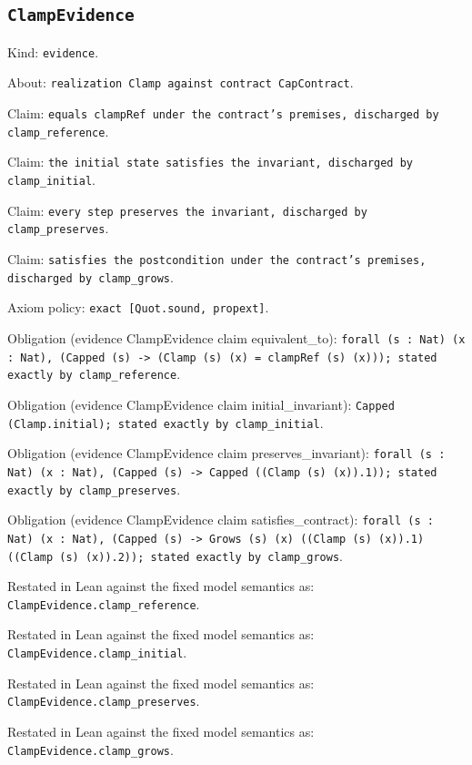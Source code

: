 \documentclass[11pt]{article}
\begin{document}
\subsection*{\texttt{ClampEvidence}}
\noindent Kind: \texttt{evidence}.\par
\noindent About: \texttt{realization Clamp against contract CapContract}.\par
\noindent Claim: \texttt{equals clampRef under the contract's premises, discharged by clamp\_reference}.\par
\noindent Claim: \texttt{the initial state satisfies the invariant, discharged by clamp\_initial}.\par
\noindent Claim: \texttt{every step preserves the invariant, discharged by clamp\_preserves}.\par
\noindent Claim: \texttt{satisfies the postcondition under the contract's premises, discharged by clamp\_grows}.\par
\noindent Axiom policy: \texttt{exact [Quot.sound, propext]}.\par
\noindent Obligation (evidence ClampEvidence claim equivalent\_to): \texttt{forall (s : Nat) (x : Nat), (Capped (s) -> (Clamp (s) (x) = clampRef (s) (x))); stated exactly by clamp\_reference}.\par
\noindent Obligation (evidence ClampEvidence claim initial\_invariant): \texttt{Capped (Clamp.initial); stated exactly by clamp\_initial}.\par
\noindent Obligation (evidence ClampEvidence claim preserves\_invariant): \texttt{forall (s : Nat) (x : Nat), (Capped (s) -> Capped ((Clamp (s) (x)).1)); stated exactly by clamp\_preserves}.\par
\noindent Obligation (evidence ClampEvidence claim satisfies\_contract): \texttt{forall (s : Nat) (x : Nat), (Capped (s) -> Grows (s) (x) ((Clamp (s) (x)).1) ((Clamp (s) (x)).2)); stated exactly by clamp\_grows}.\par
\noindent Restated in Lean against the fixed model semantics as: \texttt{ClampEvidence.clamp\_reference}.\par
\noindent Restated in Lean against the fixed model semantics as: \texttt{ClampEvidence.clamp\_initial}.\par
\noindent Restated in Lean against the fixed model semantics as: \texttt{ClampEvidence.clamp\_preserves}.\par
\noindent Restated in Lean against the fixed model semantics as: \texttt{ClampEvidence.clamp\_grows}.\par
\end{document}
